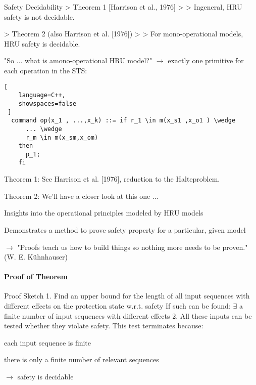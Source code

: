 \documentclass[a4paper]{article}
\begin{document}
\begin{multicols}{3}
    Safety Decidability
    > Theorem 1 [Harrison et al., 1976]
    >
    > Ingeneral, HRU safety is not decidable.

    > Theorem 2 (also Harrison et al. [1976])
    >
    > For mono-operational models, HRU safety is decidable.

    "So ... what is amono-operational HRU model?" $\rightarrow$  exactly one primitive for each operation in the STS:

    \begin{lstlisting}[
    language=C++,
    showspaces=false
 ]
  command op(x_1 , ...,x_k) ::= if r_1 \in m(x_s1 ,x_o1 ) \wedge
      ... \wedge
      r_m \in m(x_sm,x_om)
    then
      p_1;
    fi
  \end{lstlisting}
    \begin{itemize*}
        \item Theorem 1: See Harrison et al. [1976], reduction to the Halteproblem.
        \item Theorem 2: We’ll have a closer look at this one ...
              \begin{itemize*}
                  \item Insights into the operational principles modeled by HRU models
                  \item Demonstrates a method to prove safety property for a particular, given model
                  \item $\rightarrow$ "Proofs teach us how to build things so nothing more needs to be proven." (W. E. Kühnhauser)
              \end{itemize*}
    \end{itemize*}

    \paragraph{Proof of Theorem}
    \begin{itemize*}
        \item Proof Sketch
              1. Find an upper bound for the length of all input sequences with different effects on the protection state w.r.t. safety
              If such can be found: $\exists$ a finite number of input sequences with different effects
              2. All these inputs can be tested whether they violate safety. This test terminates because:
              \begin{itemize*}
                  \item each input sequence is finite
                  \item there is only a finite number of relevant sequences
              \end{itemize*}
        \item $\rightarrow$ safety is decidable
    \end{itemize*}


\end{multicols}
\end{document}
